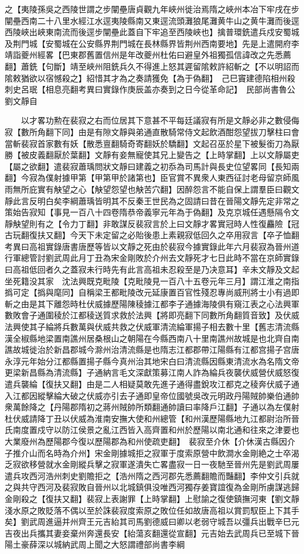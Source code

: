 之【夷陵孫吳之西陵世謂之步闡壘唐貞觀九年峽州徙治焉隋之峽州本冶下牢戌在步闡壘西南二十八里水經江水逕夷陵縣南又東逕流頭灘狼尾灘黄牛山之黄牛灘而後逕西陵峽出峽東南流而後逕步闡壘此蓋自下牢追至西陵峽也】擒普環銑遣兵戍安蜀城及荆門城【安蜀城在公安縣界荆門城在長林縣界皆荆州西南要地】先是上遣開府李靖詣夔州經畧【巴東郡舊置信州是年改夔州杜佑曰避皇外祖獨孤信諱改之先悉薦翻】蕭銑【句斷】靖至峽州阻銑兵久不得進上怒其遲留隂敕許紹斬之【不以明詔而隂敕猶欲以宿憾殺之】紹惜其才為之奏請獲免【為于偽翻】　己巳竇建德陷相州殺刺史呂珉【相息亮翻考異曰實錄作庚辰盖亦奏到之日今從革命記】　民部尚書魯公劉文靜自

　　以才畧功勲在裴寂之右而位居其下意甚不平每廷議寂有所是文靜必非之數侵侮寂【數所角翻下同】由是有隙文靜與弟通直散騎常侍文起飲酒酣怨望拔刀擊柱曰會當斬裴寂首家數有妖【散悉亶翻騎奇寄翻妖於驕翻】文起召巫於星下被髮銜刀為厭勝【被皮義翻厭於葉翻】文靜有妾無寵使其兄上變告之【上時掌翻】上以文靜屬吏【屬之欲翻】遣裴寂蕭瑀問狀文靜曰建義之初忝為司馬計與長史位望畧同【長知兩翻】今寂為僕射據甲第【甲第甲於諸第也】臣官賞不異衆人東西征討老母留京師風雨無所庇實有觖望之心【觖望怨望也觖苦穴翻】因醉怨言不能自保上謂羣臣曰觀文靜此言反明白矣李綱蕭瑀皆明其不反秦王世民為之固請曰昔在晉陽文靜先定非常之策始告寂知【事見一百八十四卷隋恭帝義寧元年為于偽翻】及克京城任遇懸隔令文靜觖望則有之【令力丁翻】非敢謀反裴寂言於上曰文靜才畧實冠時人性復麤險【冠古玩翻復扶又翻】今天下未定留之必貽後患上素親寂低回久之卒用寂言【卒子恤翻　考異曰高祖實錄唐書唐歷等皆以文靜之死由於裴寂今據實錄此年六月裴寂為晉州道行軍總管討劉武周此月丁丑為宋金剛敗於介州去文靜死才七日此時不當在京師實錄曰高祖低回者久之蓋寂未行時先有此言高祖未忍殺至是乃决意耳】辛未文靜及文起坐死籍没其家　沈法興既克毗陵【克毗陵見一百八十五卷元年三月】謂江淮之南指撝可定【撝與麾同】自稱梁王都毗陵改元延康置百官性殘忍專尚威刑將士小有過即斬之由是其下離怨時杜伏威據歷陽陳稜據江都李子通據海陵俱有窺江表之心法興軍數敗會子通圍稜於江都稜送質求救於法興【將即亮翻下同數所角翻質音致】及伏威法興使其子綸將兵數萬與伏威共救之伏威軍清流綸軍揚子相去數十里【舊志清流縣漢全椒縣地梁置南譙州居桑根山之朝陽在今縣西南八十里南譙州故城是也北齊自南譙故城徙治於新昌郡城今滁州治清流縣是也隋志江都郡帶江陽縣有江都宫揚子宫唐永淳元年始分江都縣置揚子縣今真州治其地宋白曰清流縣因縣東清流水為名隋文帝更梁新昌縣為清流縣】子通納言毛文深獻策募江南人詐為綸兵夜襲伏威營伏威怒復遣兵襲綸【復扶又翻】由是二人相疑莫敢先進子通得盡銳攻江都克之稜奔伏威子通入江都因縱擊綸大破之伏威亦引去子通即皇帝位國號吳改元明政丹陽賊帥樂伯通帥衆萬餘降之【丹陽郡隋初之蔣州賊帥所類翻通帥讀曰率降戶江翻】子通以為左僕射　杜伏威請降丁丑以伏威為淮南安撫大使和州總管【和州漢歷陽縣地九江都尉治所晉氏南度置戍守以防江侯景之亂江西皆入高齊置和州於歷陽以南北通和往來之津要也大業廢州為歷陽郡今復以歷陽郡為和州使疏吏翻】　裴寂至介休【介休漢古縣因介子推介山而名時為介州】宋金剛據城拒之寂軍于度索原營中飲澗水金剛絶之士卒渴乏寂欲移營就水金剛縱兵擊之寂軍遂潰失亡畧盡寂一日一夜馳至晉州先是劉武周屢遣兵攻西河浩州刺史劉贍拒之【浩州隋之西河郡先悉薦翻贍而豔翻】李仲文引兵就之與共守西河及裴寂敗自晉州以北城鎮俱没唯西河獨存姜寶誼復為金剛所虜謀逃歸金剛殺之【復扶又翻】裴寂上表謝罪【上時掌翻】上慰諭之復使鎮撫河東【劉文靜淺水原之敗貶落不偶以至於誅裴寂度索原之敗位任如故唐高祖以賞罰馭臣上下其手矣】劉武周進逼并州齊王元吉紿其司馬劉德威曰卿以老弱守城吾以彊兵出戰辛巳元吉夜出兵攜其妻妾棄州奔還長安【紿蕩亥翻還從宣翻】元吉始去武周兵已至城下晉陽土豪薛深以城納武周上聞之大怒謂禮部尚書李綱